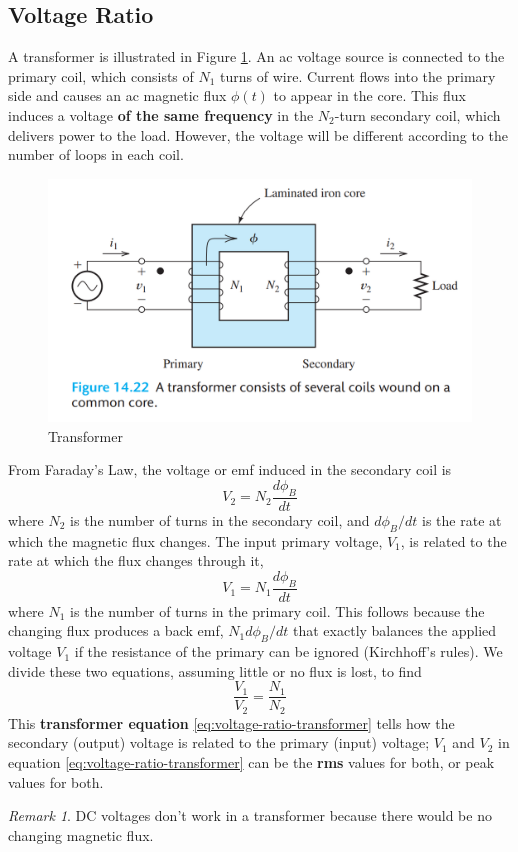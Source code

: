 \documentclass[math,code]{amznotes}
\theoremstyle{remark}
\newtheorem*{remark}{Remark}
\begin{document}
\subsection{Voltage Ratio}
A transformer is illustrated in Figure \ref{fig:transformer}. An ac voltage source is connected to the primary coil, which consists of $N_1$ turns of wire. Current flows into the primary side and causes an ac magnetic flux $\phi (t)$ to appear in the core. This flux induces a voltage \textbf{of the same frequency} in the $N_2$-turn secondary coil, which delivers power to the load. However, the voltage will be different according to the number of loops in each coil.
\begin{figure}[H]
    \centering
    \includegraphics[width=0.5\linewidth]{images/transformer.png}
    \caption{Transformer}
    \label{fig:transformer}
\end{figure}
From Faraday's Law, the voltage or emf induced in the secondary coil is
\begin{equation}
    V_2=N_2\frac{d\phi_B}{dt}
\end{equation}
where $N_2$ is the number of turns in the secondary coil, and $d\phi_B/dt$ is the rate at which the magnetic flux changes. \newline
The input primary voltage, $V_1$, is related to the rate at which the flux changes through it,
\begin{equation}
    V_1=N_1\frac{d\phi_B}{dt}
\end{equation}
where $N_1$ is the number of turns in the primary coil. This follows because the changing flux produces a back emf, $N_1d\phi_B/dt$ that exactly balances the applied voltage $V_1$ if the resistance of the primary can be ignored (Kirchhoff's rules). We divide these two equations, assuming little or no flux is lost, to find
\begin{equation} \label{eq:voltage-ratio-transformer}
    \frac{V_1}{V_2} = \frac{N_1}{N_2}
\end{equation}
This \textbf{transformer equation} \eqref{eq:voltage-ratio-transformer} tells how the secondary (output) voltage is related to the primary (input) voltage; $V_1$ and $V_2$ in equation \eqref{eq:voltage-ratio-transformer} can be the \textbf{rms} values for both, or peak values for both.
\begin{notebox}
    \begin{remark}
        DC voltages don't work in a transformer because there would be no changing magnetic flux.
    \end{remark}
\end{notebox}
\end{document}
